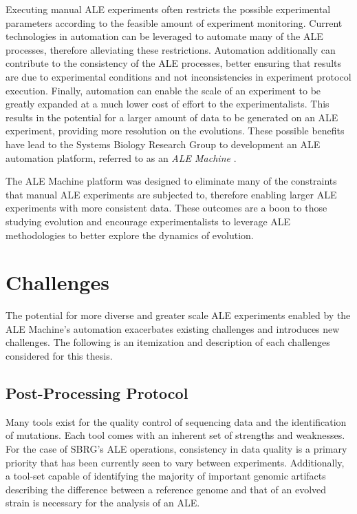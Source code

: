 \documentclass[12pt,final,masters,chapterheads]{ucsd}  %
\begin{document}
Executing manual ALE experiments often restricts the possible experimental parameters according to the feasible amount of experiment monitoring. Current technologies in automation can be leveraged to automate many of the ALE processes, therefore alleviating these restrictions. Automation additionally can contribute to the consistency of the ALE processes, better ensuring that results are due to experimental conditions and not inconsistencies in experiment protocol execution. Finally, automation can enable the scale of an experiment to be greatly expanded at a much lower cost of effort to the experimentalists. This results in the potential for a larger amount of data to be generated on an ALE experiment, providing more resolution on the evolutions. These possible benefits have lead to the Systems Biology Research Group to development an ALE automation platform, referred to as an \textit{ALE Machine} \cite{ryan_thesis}.

The ALE Machine platform was designed to eliminate many of the constraints that manual ALE experiments are subjected to, therefore enabling larger ALE experiments with more consistent data. These outcomes are a boon to those studying evolution and encourage experimentalists to leverage ALE methodologies to better explore the dynamics of evolution.

\section{Challenges}

% 
% 

The potential for more diverse and greater scale ALE experiments enabled by the ALE Machine's automation exacerbates existing challenges and introduces new challenges. The following is an itemization and description of each challenges considered for this thesis.

\subsection{Post-Processing Protocol}

Many tools exist for the quality control of sequencing data and the identification of mutations. Each tool comes with an inherent set of strengths and weaknesses. For the case of SBRG's ALE operations, consistency in data quality is a primary priority that has been currently seen to vary between experiments. Additionally, a tool-set capable of identifying the majority of important genomic artifacts describing the difference between a reference genome and that of an evolved strain is necessary for the analysis of an ALE.
\end{document}
